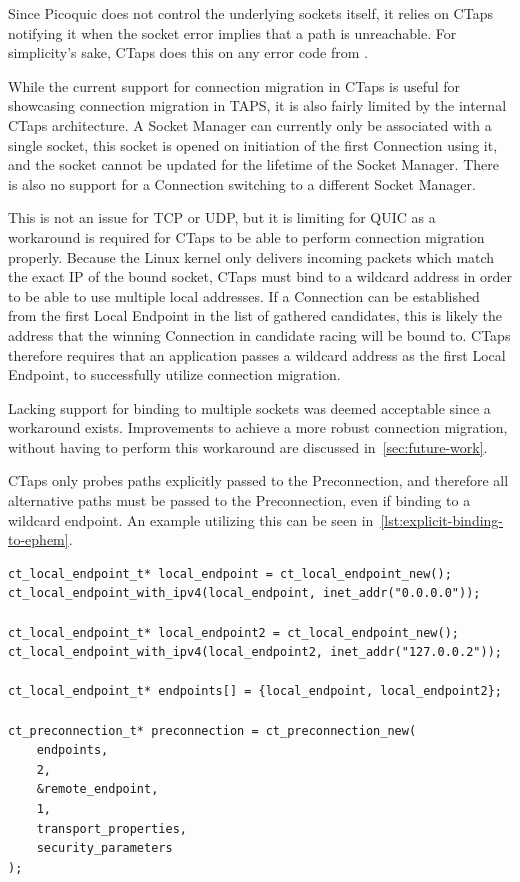 Since Picoquic does not control the underlying sockets itself, it relies
on CTaps notifying it when the socket error implies that a path is unreachable.
For simplicity's sake, CTaps does this on any error code from .

While the current support for connection migration in CTaps
is useful for showcasing connection migration in TAPS,
it is also fairly limited by the internal CTaps architecture.
A Socket Manager can currently only be associated with a
single socket, this socket is opened on initiation of
the first Connection using it, and the socket cannot be updated
for the lifetime of the Socket Manager. There is also
no support for a Connection switching to a different Socket Manager.

This is not an issue for TCP or UDP, but it is limiting for QUIC
as a workaround is required for CTaps to be able to perform connection
migration properly. Because the Linux kernel only delivers incoming packets
which match the exact IP of the bound socket, CTaps must
bind to a wildcard address in order to be able to use multiple local
addresses. If a Connection can be established from the first Local Endpoint in the
list of gathered candidates, this is likely the address that the winning
Connection in candidate racing will be bound to.
CTaps therefore requires that an application passes a wildcard address as
the first Local Endpoint, to successfully utilize connection migration.

Lacking support for binding to multiple sockets was deemed acceptable since a workaround exists.
Improvements to achieve
a more robust connection migration, without having to
perform this workaround are discussed in~\cref{sec:future-work}.

CTaps only probes paths explicitly passed to the Preconnection,
and therefore all alternative paths must be passed to the Preconnection,
even if binding to a wildcard endpoint. An example utilizing
this can be seen in~\cref{lst:explicit-binding-to-ephem}.

\begin{listing}[htbp]
  \centering
\begin{verbatim}
ct_local_endpoint_t* local_endpoint = ct_local_endpoint_new();
ct_local_endpoint_with_ipv4(local_endpoint, inet_addr("0.0.0.0"));

ct_local_endpoint_t* local_endpoint2 = ct_local_endpoint_new();
ct_local_endpoint_with_ipv4(local_endpoint2, inet_addr("127.0.0.2"));

ct_local_endpoint_t* endpoints[] = {local_endpoint, local_endpoint2};

ct_preconnection_t* preconnection = ct_preconnection_new(
    endpoints,
    2,
    &remote_endpoint,
    1,
    transport_properties,
    security_parameters
);
\end{verbatim}
\caption[CTaps QUIC migration workaround]
{
Code snippet from the CTaps experiment client showing the workaround for QUIC connection migration,
explicitly binding to 0.0.0.0, before passing 127.0.0.2 as an alternative address to probe.
}
\label{lst:explicit-binding-to-ephem}
\end{listing}

